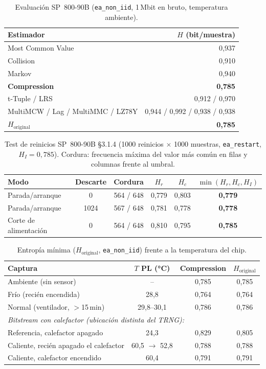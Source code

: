 \documentclass[a4paper,11pt]{article}
\newcommand{\code}[1]{\texttt{#1}}
\begin{document}
\begin{table}[htbp]
\centering
\caption{Evaluación SP~800-90B (\code{ea\_non\_iid}, 1\,Mbit en bruto, temperatura ambiente).}
\begin{tabular}{lr}
\toprule
Estimador & $H$ (bit/muestra) \\
\midrule
Most Common Value & 0,937 \\
Collision & 0,910 \\
Markov & 0,940 \\
\textbf{Compression} & \textbf{0,785} \\
t-Tuple / LRS & 0,912 / 0,970 \\
MultiMCW / Lag / MultiMMC / LZ78Y & 0,944 / 0,992 / 0,938 / 0,938 \\
\midrule
$H_{\text{original}}$ & \textbf{0,785} \\
\bottomrule
\end{tabular}
\end{table}

\begin{table}[htbp]
\centering
\caption{Test de reinicios SP~800-90B §3.1.4 (1000 reinicios $\times$ 1000 muestras, \code{ea\_restart}, $H_I = 0{,}785$).
Cordura: frecuencia máxima del valor más común en filas y columnas frente al umbral.}
\small
\begin{tabular}{lccccc}
\toprule
Modo & Descarte & Cordura & $H_r$ & $H_c$ & $\min(H_r, H_c, H_I)$ \\
\midrule
Parada/arranque & 0 & 564 / 648 & 0,779 & 0,803 & \textbf{0,779} \\
Parada/arranque & 1024 & 567 / 648 & 0,781 & 0,778 & \textbf{0,778} \\
Corte de alimentación & 0 & 564 / 648 & 0,810 & 0,795 & \textbf{0,785} \\
\bottomrule
\end{tabular}
\end{table}

\begin{table}[htbp]
\centering
\caption{Entropía mínima ($H_{\text{original}}$, \code{ea\_non\_iid}) frente a la temperatura del chip.}
\begin{tabular}{lccc}
\toprule
Captura & $T$ PL (°C) & Compression & $H_{\text{original}}$ \\
\midrule
Ambiente (sin sensor) & -- & 0,785 & 0,785 \\
Frío (recién encendida) & 28,8 & 0,764 & 0,764 \\
Normal (ventilador, $>$15\,min) & 29,8--30,1 & 0,786 & 0,786 \\
\midrule
\multicolumn{4}{l}{\emph{Bitstream con calefactor (ubicación distinta del TRNG):}} \\
Referencia, calefactor apagado & 24,3 & 0,829 & 0,805 \\
Caliente, recién apagado el calefactor & 60,5 $\rightarrow$ 52,8 & 0,788 & 0,788 \\
Caliente, calefactor encendido & 60,4 & 0,791 & 0,791 \\
\bottomrule
\end{tabular}
\end{table}
\end{document}
